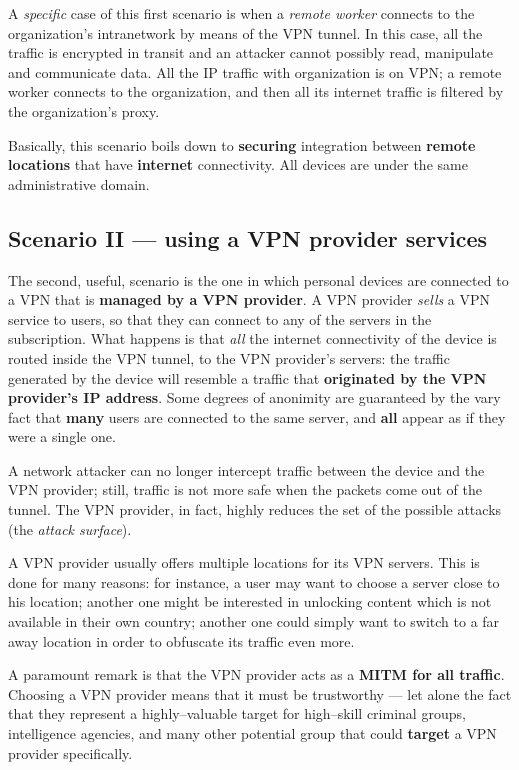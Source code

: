 \documentclass[10pt]{\classname}
\begin{document}
A \emph{specific} case of this first scenario is when a \emph{remote worker}
connects to the organization's intranetwork by means of the VPN tunnel. In this
case, all the traffic is encrypted in transit and an attacker cannot possibly
read, manipulate and communicate data. All the IP traffic with organization is
on VPN; a remote worker connects to the organization, and then all its internet
traffic is filtered by the organization's proxy.

Basically, this scenario boils down to \textbf{securing} integration between
\textbf{remote locations} that have \textbf{internet} connectivity. All devices
are under the same administrative domain.

\subsection{Scenario II --- using a VPN provider services}

The second, useful, scenario is the one in which personal devices are connected
to a VPN that is \textbf{managed by a VPN provider}. A VPN provider
\emph{sells} a VPN service to users, so that they can connect to any of the
servers in the subscription. What happens is that \emph{all} the internet
connectivity of the device is routed inside the VPN tunnel, to the VPN
provider's servers: the traffic generated by the device will resemble a traffic
that \textbf{originated by the VPN provider's IP address}. Some degrees of
anonimity are guaranteed by the vary fact that \textbf{many} users are
connected to the same server, and \textbf{all} appear as if they were a single
one.

A network attacker can no longer intercept traffic between the device and the
VPN provider; still, traffic is not more safe when the packets come out of the
tunnel. The VPN provider, in fact, highly reduces the set of the possible
attacks (the \emph{attack surface}).

A VPN provider usually offers multiple locations for its VPN servers. This is
done for many reasons: for instance, a user may want to choose a server close
to his location; another one might be interested in unlocking content which is
not available in their own country; another one could simply want to switch to
a far away location in order to obfuscate its traffic even more.

A paramount remark is that the VPN provider acts as a \textbf{MITM for all
traffic}. Choosing a VPN provider means that it must be trustworthy --- let
alone the fact that they represent a highly--valuable target for high--skill
criminal groups, intelligence agencies, and many other potential group that
could \textbf{target} a VPN provider specifically.
\end{document}
